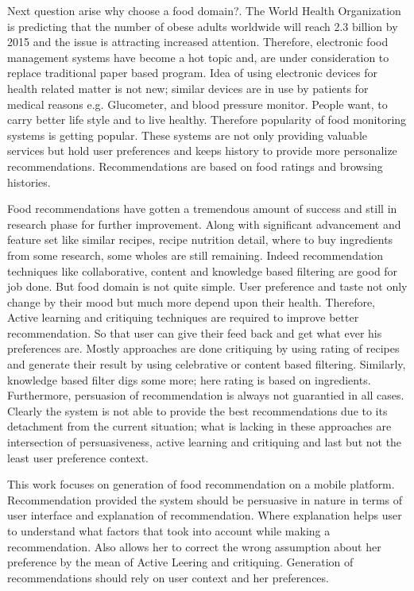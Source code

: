 Next question arise why choose a food domain?. The World Health Organization \cite{world2008information} is predicting that the number of obese adults worldwide will reach 2.3 billion by 2015 and the issue is attracting increased attention. Therefore, electronic food management systems have become a hot topic and, are under consideration to replace traditional paper based program. Idea of using electronic devices for health related matter is not new; similar devices are in use by patients for medical reasons e.g. Glucometer, and blood pressure monitor. People want, to carry better life style and to live healthy. Therefore popularity of food monitoring systems is getting popular.  These systems are not only providing valuable services but hold user preferences and keeps history to provide more personalize recommendations. Recommendations are based on food ratings and browsing histories.\newline

Food recommendations have gotten a tremendous amount of success and still in research phase for further improvement. Along with significant advancement and feature set like similar recipes, recipe nutrition detail, where to buy ingredients from some research, some wholes are still remaining. Indeed recommendation techniques like collaborative, content and knowledge based filtering are good for job done. But food domain is not quite simple. User preference and taste not only change by their mood but much more depend upon their health. Therefore, Active learning and critiquing techniques are required to improve better recommendation. So that user can give their feed back and get what ever his preferences are. Mostly approaches are done critiquing by using rating of recipes and generate their result by using celebrative or content based filtering. Similarly, knowledge based filter digs some more; here rating is based on ingredients. Furthermore, persuasion of recommendation is always not guarantied in all cases. Clearly the system is not able to provide the best recommendations due to its detachment from the current situation; what is lacking in these approaches are intersection of persuasiveness, active learning and critiquing and last but not the least user preference context.\newline

This work focuses on generation of food recommendation on a mobile platform. Recommendation provided the system should be persuasive in nature in terms of user interface and explanation of recommendation. Where explanation helps user to understand what factors that took into account while making a recommendation. Also allows her to correct the wrong assumption about her preference by the mean of Active Leering and critiquing. Generation of recommendations should rely on user context and her preferences. 
\newline

